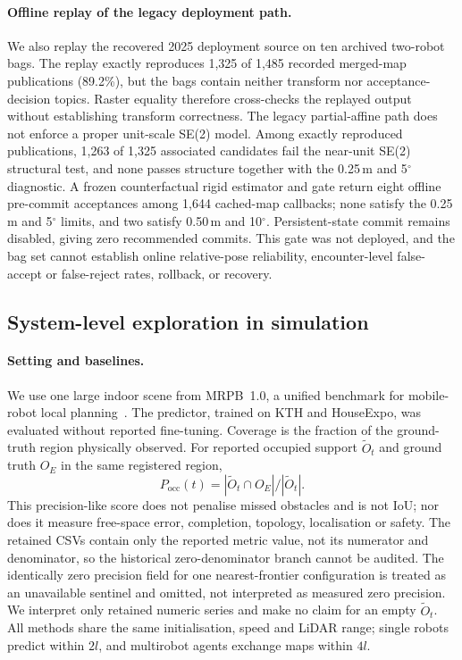 \documentclass[11pt]{article}
\begin{document}
\paragraph{Offline replay of the legacy deployment path.}
We also replay the recovered 2025 deployment source on ten archived two-robot bags. The replay exactly reproduces 1{,}325 of 1{,}485 recorded merged-map publications (89.2\%), but the bags contain neither transform nor acceptance-decision topics. Raster equality therefore cross-checks the replayed output without establishing transform correctness. The legacy partial-affine path does not enforce a proper unit-scale SE(2) model. Among exactly reproduced publications, 1{,}263 of 1{,}325 associated candidates fail the near-unit SE(2) structural test, and none passes structure together with the 0.25\,m and 5$^{\circ}$ diagnostic. A frozen counterfactual rigid estimator and gate return eight offline pre-commit acceptances among 1{,}644 cached-map callbacks; none satisfy the 0.25\,m and 5$^{\circ}$ limits, and two satisfy 0.50\,m and 10$^{\circ}$. Persistent-state commit remains disabled, giving zero recommended commits. This gate was not deployed, and the bag set cannot establish online relative-pose reliability, encounter-level false-accept or false-reject rates, rollback, or recovery.




\subsection{System-level exploration in simulation} \label{sec:exploration-efficiency}

\paragraph{Setting and baselines.}
We use one large indoor scene from MRPB~1.0, a unified benchmark for mobile-robot local planning~\citep{wen2021mrpb}. The predictor, trained on KTH and HouseExpo, was evaluated without reported fine-tuning. Coverage is the fraction of the ground-truth region physically observed. For reported occupied support $\widetilde O_t$ and ground truth $O_E$ in the same registered region,
\[
P_{\mathrm{occ}}(t)=|\widetilde O_t\cap O_E|/|\widetilde O_t|.
\]
This precision-like score does not penalise missed obstacles and is not IoU; nor does it measure free-space error, completion, topology, localisation or safety. The retained CSVs contain only the reported metric value, not its numerator and denominator, so the historical zero-denominator branch cannot be audited. The identically zero precision field for one nearest-frontier configuration is treated as an unavailable sentinel and omitted, not interpreted as measured zero precision. We interpret only retained numeric series and make no claim for an empty $\widetilde O_t$. All methods share the same initialisation, speed and LiDAR range; single robots predict within $2l$, and multirobot agents exchange maps within $4l$.
\end{document}
